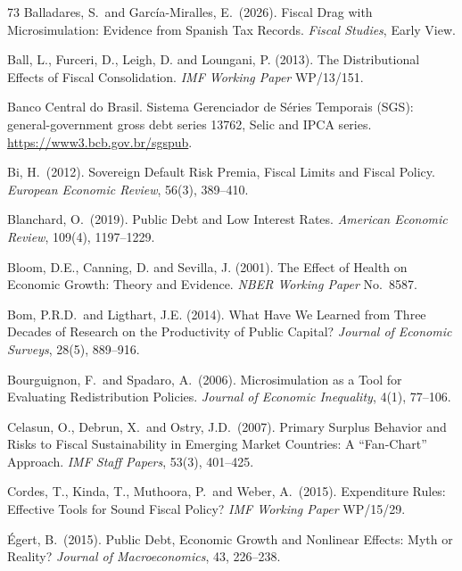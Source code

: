 \documentclass[11pt,a4paper]{article}
\begin{document}
\begin{thebibliography}{73}
 Balladares, S.\ and Garc\'ia-Miralles, E.\ (2026). Fiscal Drag with Microsimulation: Evidence from Spanish Tax Records. \textit{Fiscal Studies}, Early View.

 Ball, L., Furceri, D., Leigh, D. and Loungani, P. (2013). The Distributional Effects of Fiscal Consolidation. \textit{IMF Working Paper} WP/13/151.

 Banco Central do Brasil. Sistema Gerenciador de S\'eries Temporais (SGS): general-government gross debt series 13762, Selic and IPCA series. \url{https://www3.bcb.gov.br/sgspub}.

 Bi, H.\ (2012). Sovereign Default Risk Premia, Fiscal Limits and Fiscal Policy. \textit{European Economic Review}, 56(3), 389--410.

 Blanchard, O.\ (2019). Public Debt and Low Interest Rates. \textit{American Economic Review}, 109(4), 1197--1229.

 Bloom, D.E., Canning, D. and Sevilla, J. (2001). The Effect of Health on Economic Growth: Theory and Evidence. \textit{NBER Working Paper} No.\ 8587.

 Bom, P.R.D.\ and Ligthart, J.E. (2014). What Have We Learned from Three Decades of Research on the Productivity of Public Capital? \textit{Journal of Economic Surveys}, 28(5), 889--916.

 Bourguignon, F.\ and Spadaro, A.\ (2006). Microsimulation as a Tool for Evaluating Redistribution Policies. \textit{Journal of Economic Inequality}, 4(1), 77--106.

 Celasun, O., Debrun, X.\ and Ostry, J.D.\ (2007). Primary Surplus Behavior and Risks to Fiscal Sustainability in Emerging Market Countries: A ``Fan-Chart'' Approach. \textit{IMF Staff Papers}, 53(3), 401--425.

 Cordes, T., Kinda, T., Muthoora, P.\ and Weber, A.\ (2015). Expenditure Rules: Effective Tools for Sound Fiscal Policy? \textit{IMF Working Paper} WP/15/29.

 \'Egert, B.\ (2015). Public Debt, Economic Growth and Nonlinear Effects: Myth or Reality? \textit{Journal of Macroeconomics}, 43, 226--238.


\end{thebibliography}
\end{document}
